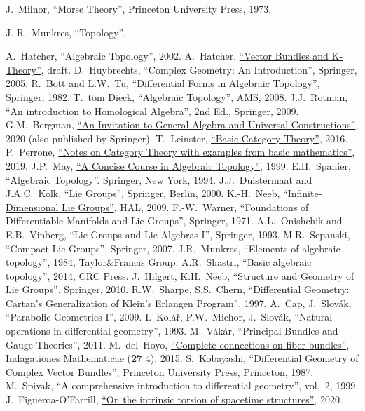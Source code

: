 \begin{thebibliography}{}
    
    J.~Milnor, ``Morse Theory'', Princeton University Press, 1973.
    
    J. R.~Munkres, ``Topology''.
    
     A.~Hatcher, ``Algebraic Topology'', 2002.
     A.~Hatcher, \href{https://pi.math.cornell.edu/~hatcher/VBKT/VB.pdf}{``Vector Bundles and K-Theory''}, draft.
     D.~Huybrechts, ``Complex Geometry: An Introduction'', Springer, 2005.
     R.~Bott and L.W.~Tu, ``Differential Forms in Algebraic Topology'', Springer, 1982.
     T.~tom Dieck, ``Algebraic Topology'', AMS, 2008.
     J.J.~Rotman, ``An introduction to Homological Algebra'', 2nd Ed., Springer, 2009.
     G.M.~Bergman, \href{https://math.berkeley.edu/~gbergman/245/}{``An Invitation to General Algebra and Universal Constructions''}, 2020 (also published by Springer).
     T.~Leinster, \href{https://arxiv.org/abs/1612.09375}{``Basic Category Theory''}, 2016.
     P.~Perrone, \href{https://arxiv.org/abs/1912.10642}{``Notes on Category Theory with examples from basic mathematics''}, 2019.
     J.P.~May, \href{https://www.math.uchicago.edu/~may/CONCISE/ConciseRevised.pdf}{``A Concise Course in Algebraic Topology''}, 1999.
     E.H.~Spanier, ``Algebraic Topology''. Springer, New York, 1994.
     J.J.~Duistermaat and J.A.C.~Kolk, ``Lie Groups'', Springer, Berlin, 2000.
     K.-H.~Neeb, \href{https://cel.hal.science/cel-00391789}{``Infinite-Dimensional Lie Groups''}, HAL, 2009.
     F.-W.~Warner, ``Foundations of Differentiable Manifolds and Lie Groups'', Springer, 1971.
     A.L.~Onishchik and E.B.~Vinberg, ``Lie Groups and Lie Algebras I'', Springer, 1993.
     M.R.~Sepanski, ``Compact Lie Groups'', Springer, 2007.
     J.R.~Munkres, ``Elements of algebraic topology'', 1984, Taylor\&Francis Group.
     A.R.~Shastri, ``Basic algebraic topology'', 2014, CRC Press.
     J.~Hilgert, K.H.~Neeb, ``Structure and Geometry of Lie Groups'', Springer, 2010.
      R.W.~Sharpe, S.S.~Chern, ``Differential Geometry: Cartan's Generalization of Klein's Erlangen Program'', 1997.
     A.~Cap, J.~Slov\'ak, ``Parabolic Geometries I'', 2009.
     I.~Kol\'a\v{r}, P.W.~Michor, J.~Slov\'ak, ``Natural operations in differential geometry'', 1993.
     M.~V\'ak\'ar, ``Principal Bundles and Gauge Theories'', 2011.
     M.~del~Hoyo, \href{https://arxiv.org/abs/1512.03847}{``Complete connections on fiber bundles''}, Indagationes Mathematicae (\textbf{27} 4), 2015.
     S.~Kobayashi, ``Differential Geometry of Complex Vector Bundles'', Princeton University Press, Princeton, 1987.
     M.~Spivak, ``A comprehensive introduction to differential geometry'', vol.~2, 1999.
     J.~Figueroa-O'Farrill, \href{https://arxiv.org/abs/2009.01948v1}{``On the intrinsic torsion of spacetime structures''}, 2020.
    
    
    
\end{thebibliography}